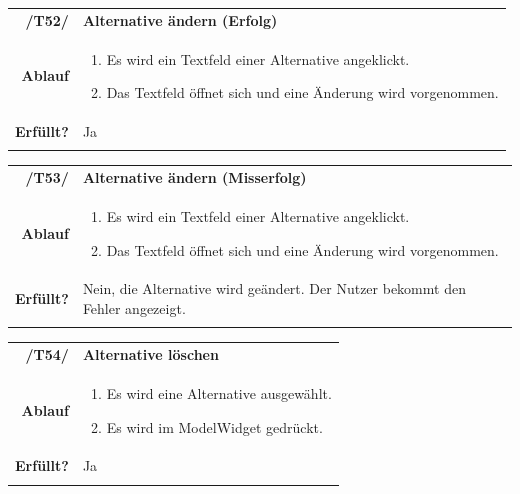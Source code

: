 \documentclass{article}
\newcommand{\guibutton}[1]{\fbox{\texttt{#1}}}
\begin{document}
\begin{table}[H]
\begin{tabularx}{\textwidth}{rX}
\vspace{1mm}
\textbf{/T52/}         & \textbf{Alternative ändern (Erfolg)} \\ \vspace{1mm}
\textbf{Ablauf} & 
\begin{enumerate}
        \item Es wird ein Textfeld einer Alternative angeklickt.
        \item Das Textfeld öffnet sich und eine Änderung wird vorgenommen.
    \end{enumerate} \\ \vspace{1mm}
\textbf{Erfüllt?}  & Ja \\ \vspace{1mm}
\end{tabularx}
\end{table}

\begin{table}[H]
\begin{tabularx}{\textwidth}{rX}
\vspace{1mm}
\textbf{/T53/}         & \textbf{Alternative ändern (Misserfolg)} \\ \vspace{1mm}
\textbf{Ablauf} & 
\begin{enumerate}
        \item Es wird ein Textfeld einer Alternative angeklickt.
        \item Das Textfeld öffnet sich und eine Änderung wird vorgenommen.
    \end{enumerate} \\ \vspace{1mm}
\textbf{Erfüllt?}  & Nein, die Alternative wird geändert. Der Nutzer bekommt den Fehler angezeigt. \\ \vspace{1mm}
\end{tabularx}
\end{table}

\begin{table}[H]
\begin{tabularx}{\textwidth}{rX}
\vspace{1mm}
\textbf{/T54/}         & \textbf{Alternative löschen} \\ \vspace{1mm}
\textbf{Ablauf} & 
\begin{enumerate}
        \item Es wird eine Alternative ausgewählt.
        \item Es wird \guibutton{-} im ModelWidget gedrückt.
    \end{enumerate} \\ \vspace{1mm}
\textbf{Erfüllt?}  & Ja \\ \vspace{1mm}
\end{tabularx}
\end{table}
\end{document}
